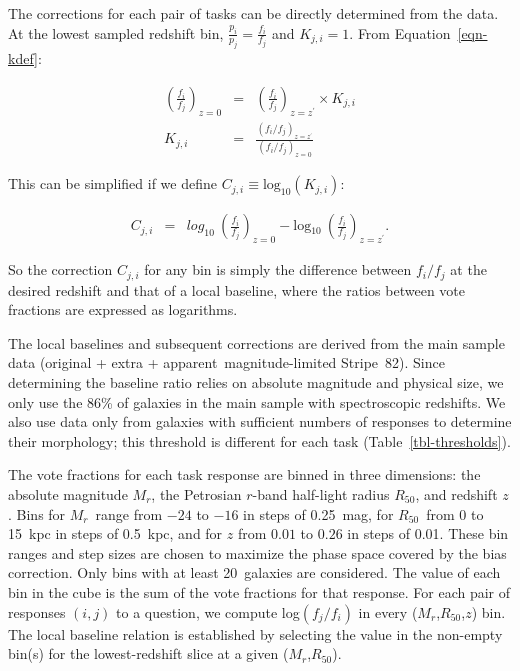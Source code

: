 \documentclass[useAMS,usenatbib]{mn2e}
\newcommand{\mr}{$M_r$}
\newcommand{\rfifty}{$R_{50}$}
\newcommand{\redshift}{$z$}
\begin{document}
The corrections for each pair of tasks can be directly determined from the data. At the lowest sampled redshift bin, $\frac{p_i}{p_j} = \frac{f_i}{f_j}$ and $K_{j,i}=1$. From Equation~\ref{eqn-kdef}:

\begin{eqnarray}
\left(\frac{f_i}{f_j}\right)_{z=0} &=& \left(\frac{f_i}{f_j}\right)_{z=z^\prime}\times K_{j,i} \\
K_{j,i} &=& \frac{\left(f_i/f_j\right)_{z=z^\prime} }{ \left(f_i/f_j\right)_{z=0}}
\label{eqnarray-adjprob3}
\end{eqnarray}

\noindent This can be simplified if we define $C_{j,i}\equiv\text{log}_{10}(K_{j,i})$:

\begin{eqnarray}
C_{j,i} &=& \text{$log_{10}$}~\left(\frac{f_i}{f_j}\right)_{z=0} - \text{log$_{10}$}~\left(\frac{f_i}{f_j}\right)_{z=z^\prime}.
\label{eqnarray-adjprob4}
\end{eqnarray}

\noindent So the correction $C_{j,i}$ for any bin is simply the difference between $f_i/f_j$ at the desired redshift and that of a local baseline, where the ratios between vote fractions are expressed as logarithms.  

The local baselines and subsequent corrections are derived from the main sample data (original + extra + apparent~magnitude-limited Stripe~82). Since determining the baseline ratio relies on absolute magnitude and physical size, we only use the 86\% of galaxies in the main sample with spectroscopic redshifts. We also use data only from galaxies with sufficient numbers of responses to determine their morphology; this threshold is different for each task (Table~\ref{tbl-thresholds}).  

The vote fractions for each task response are binned in three dimensions: the absolute magnitude \mr, the Petrosian $r$-band half-light radius \rfifty, and redshift $z$. Bins for \mr~range from $-24$ to $-16$ in steps of 0.25~mag, for \rfifty~from 0 to 15~kpc in steps of 0.5~kpc, and for $z$ from $0.01$ to $0.26$ in steps of 0.01. These bin ranges and step sizes are chosen to maximize the phase space covered by the bias correction. Only bins with at least 20~galaxies are considered. The value of each bin in the cube is the sum of the vote fractions for that response. For each pair of responses $(i,j)$ to a question, we compute log$(f_j/f_i)$ in every (\mr,\rfifty,\redshift) bin. The local baseline relation is established by selecting the value in the non-empty bin(s) for the lowest-redshift slice at a given (\mr,\rfifty). 
\end{document}
